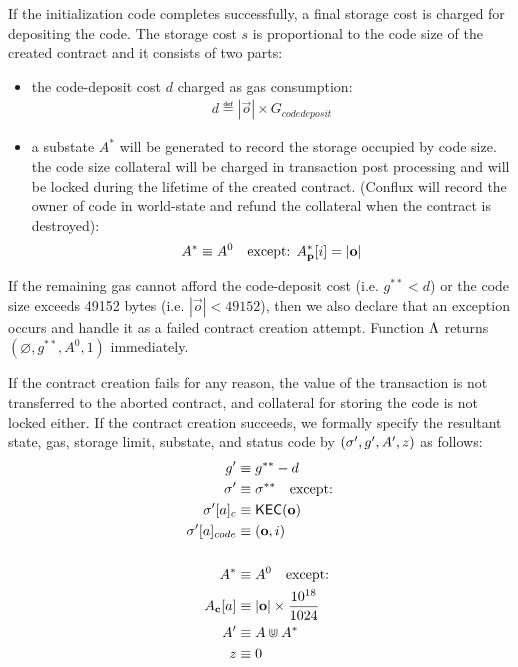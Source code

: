 If the initialization code completes successfully,
a final storage cost is charged for depositing the code.
The storage cost $s$ is proportional to the code size of the created contract and it consists of two parts:
\begin{itemize}
	\item the code-deposit cost $d$ charged as gas consumption:
	\begin{align}
		d \eqdef   |\vec{o}| \times G_{codedeposit}
	\end{align}

	\item a substate $A^{*}$ will be generated to record the storage occupied by code size. the code size collateral will be charged in transaction post processing and will be locked during the lifetime of the created contract. (Conflux will record the owner of code in world-state and refund the collateral when the contract is destroyed):
	\begin{align}
		A^{*} \equiv   A^0 \quad\mbox{except: }A^*_{\bf p}[i]=|\mathbf{o}|
	\end{align}
\end{itemize}


If the remaining gas cannot afford the code-deposit cost (i.e. $g^{**}<d$) or the code size exceeds 49152 bytes (i.e. $|\vec{o}|<49152$), then we also declare that an exception occurs and handle it as a failed contract creation attempt. 
%
Function $\mathrm{\Lambda}$ returns $(\varnothing,g^{**},A^0,1)$ immediately. 

If the contract creation fails for any reason, the value of the transaction is not transferred to the aborted contract, and collateral for storing the code is not locked either.
If the contract creation succeeds, we formally specify the resultant state, gas, storage limit, substate, and status code by $\left(\mathbf{\sigma}', g', A', z\right)$ as follows:
\begin{align}
	g' &\equiv g^{**}-d \\
	\mathbf{\sigma}' &\equiv \mathbf{\sigma}^{**} \quad\mbox{except:} \\
		\mathbf{\sigma}'[a]_c &\equiv \mathsf{KEC}(\mathbf{o}) \\ 
		\mathbf{\sigma}'[a]_{code} &\equiv (\mathbf{o},i) \\
	\notag \\
	A^* &\equiv A^0 \quad\mbox{except:} \\
	A_{\bf c}[a] &\equiv |\mathbf{o}|\times \frac{10^{18}}{1024} \\
	A' &\equiv A \Cup A^{*} \\ 
	z &\equiv 0
\end{align}

